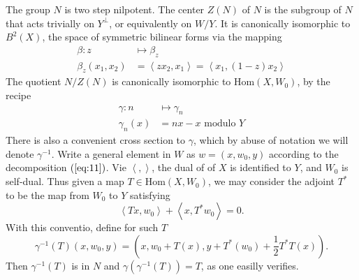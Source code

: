 \documentclass[12pt]{amsart}
\def\inn#1#2{\left\langle{#1},{#2}\right\rangle}
\def\Hom{{\mathrm{Hom}}}
\begin{document}
The group $N$ is two step nilpotent. The center $Z(N)$ of $N$ is the subgroup
of $N$ that acts trivially on $Y^\perp$, or equivalently on $W/Y$.
It is canonically isomorphic to $B^2(X)$, the space of symmetric 
bilinear forms via the mapping
\begin{equation}\label{eq:13}
\begin{split}
\beta: z &\mapsto \beta_z\\
\beta_z(x_1,x_2)&=\inn{zx_2}{x_1}=\inn{x_1}{(1-z)x_2}
\end{split}
\end{equation}
The quotient $N/Z(N)$ is canonically isomorphic to $\Hom(X,W_0)$, 
by the recipe
\begin{equation}\label{eq:14}
\begin{split}
\gamma:n & \mapsto \gamma_n\\
\gamma_n(x)& = nx-x \text{ modulo } Y
\end{split}
\end{equation}
There is also a convenient cross section to $\gamma$, 
which by abuse of notation we will denote $\gamma^{-1}$. 
Write a general element in $W$ as $w=(x,w_0,y)$
according to the decomposition $(\ref{eq:11})$.
Vie $\inn{}{}$, the dual of of $X$ is identified to $Y$, 
and $W_0$ is self-dual. 
Thus given a map $T\in \Hom(X,W_0)$, 
we may consider the adjoint $T^*$ to be the map from $W_0$ 
to $Y$ satisfying
\[
\inn{Tx}{w_0} +\inn{x}{T^*w_0} = 0.
\]
With this conventio, define for such $T$
\begin{equation}\label{eq:16}
\gamma^{-1}(T)(x,w_0,y) = (x,w_0+T(x),y+T^*(w_0)+ \frac{1}{2} T^*T(x)).
\end{equation}
Then $\gamma^{-1}(T)$ is in $N$ and $\gamma(\gamma^{-1}(T))=T$, 
as one easilly verifies. 
\end{document}

